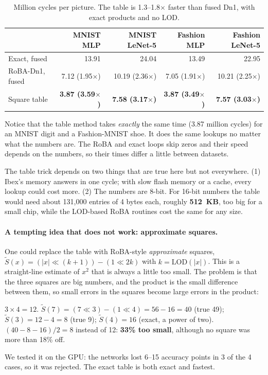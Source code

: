 \begin{table}[H]
\centering
\small
\begin{tabular}{lrrrr}
\toprule
 & MNIST MLP & MNIST LeNet-5 & Fashion MLP & Fashion LeNet-5\\
\midrule
Exact, fused & 13.91 & 24.04 & 13.49 & 22.95\\
RoBA-Dn1, fused & 7.12 (1.95$\times$) & 10.19 (2.36$\times$) & 7.05 (1.91$\times$) & 10.21 (2.25$\times$)\\
Square table & \textbf{3.87 (3.59$\times$)} & \textbf{7.58 (3.17$\times$)} & \textbf{3.87 (3.49$\times$)} & \textbf{7.57 (3.03$\times$)}\\
\bottomrule
\end{tabular}
\caption{Million cycles per picture. The table is 1.3--1.8$\times$ faster than fused Dn1, with exact
products and no LOD.}
\end{table}

\begin{kid}
Notice that the table method takes \emph{exactly} the same time (3.87 million cycles) for an MNIST
digit and a Fashion-MNIST shoe. It does the same lookups no matter what the numbers are. The RoBA and
exact loops skip zeros and their speed depends on the numbers, so their times differ a little between
datasets.
\end{kid}

\begin{careful}
The table trick depends on two things that are true here but not everywhere. (1) Ibex's memory answers in
one cycle; with slow flash memory or a cache, every lookup could cost more. (2) The numbers are 8-bit. For
16-bit numbers the table would need about 131{,}000 entries of 4 bytes each, roughly \textbf{512~KB}, too
big for a small chip, while the LOD-based RoBA routines cost the same for any size.
\end{careful}

\paragraph{A tempting idea that does not work: approximate squares.} One could replace the table with
RoBA-style \emph{approximate} squares, $\tilde S(x) = (|x| \ll (k+1)) - (1\ll 2k)$ with $k = \text{LOD}(|x|)$.
This is a straight-line estimate of $x^2$ that is always a little too small. The problem is that the
three squares are big numbers, and the product is the small difference between them, so small errors in
the squares become large errors in the product:
\begin{example}
$3\times4 = 12$. $\tilde S(7) = (7\ll3) - (1\ll4) = 56-16 = 40$ (true 49); $\tilde S(3) = 12-4 = 8$
(true 9); $\tilde S(4) = 16$ (exact, a power of two).
$(40 - 8 - 16)/2 = 8$ instead of 12: \textbf{33\% too small}, although no square was more than 18\% off.
\end{example}
We tested it on the GPU: the networks lost 6--15 accuracy points in 3 of the 4 cases, so it was rejected.
The exact table is both exact and fastest.

